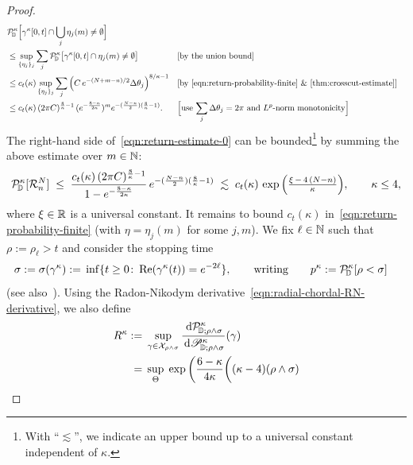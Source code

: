 \documentclass[a4paper, 11pt]{article}
\theoremstyle{definition}
\numberwithin{equation}{section}
\numberwithin{figure}{section}
\renewcommand\Re{\operatorname{Re}}
\newcommand{\Dpaths}[1][]{\cX_{#1}}
\newcommand{\rhittingtime}[1][]{\rho_{#1}}
\newcommand{\rDmeas}[1]{\mathcal{P}^{#1}_{\!\bD}}
\newcommand{\rDmeasure}[2][]{\mathcal{P}^{#2}_{\!\bD;#1}}
\newcommand{\cDmeasure}[2][]{\mathscr{P}^{#2}_{\!\bD;#1}}
\newcommand{\returnevent}[2]{\mathcal{R}_{#1}^{#2}}
\begin{document}
\begin{proof}
\begin{align*}
&\rDmeas{\kappa}\Big[\gamma^\kappa[0,t] \cap \bigcup_j \eta_j(m) \ne \emptyset\Big] \\
&\le \sup_{\{\eta_j\}_j} \sum_j \rDmeas{\kappa}\big[\gamma^\kappa[0,t] \cap \eta_j(m) \ne \emptyset\big] && \textnormal{[by the union bound]} \\
&\le c_t(\kappa) \sup_{\{\eta_j\}_j} \sum_j\Big(C \, e^{-(N+m-n)/2}\Delta\theta_j\Big)^{8/\kappa - 1}  && \textnormal{[by~\eqref{eqn:return-probability-finite}~\&~\Cref{thm:crosscut-estimate}]} \\
&\le c_t(\kappa) \, (2\pi C)^{\frac{8}{\kappa}-1} \, (e^{-\frac{8-\kappa}{2\kappa}})^{m}e^{-(\frac{N-n}{2})(\frac{8}{\kappa}-1)} . && 
\textnormal{\Big[use $\sum_j \Delta\theta_j = 2\pi$ and $L^p$-norm monotonicity\Big]}
\end{align*}
The right-hand side of~\eqref{eqn:return-estimate-0} can be bounded\footnote{With ``$\lesssim$'', we indicate an upper bound up to a universal constant independent of $\kappa$.} 
by summing the above estimate over $m \in \mathbb{N}$:
\begin{align}\label{eqn:return-estimate-1}
\rDmeas{\kappa}[\returnevent{n}{N}] 
\;\le\; \frac{c_t(\kappa) \,  (2\pi C)^{\frac{8}{\kappa}-1}}{1-e^{-\frac{8-\kappa}{2\kappa}}} \, e^{-(\frac{N-n}{2})(\frac{8}{\kappa}-1)} 
\;\lesssim\; c_t(\kappa) \, \exp\Big( \tfrac{\xi \, - \, 4 \, (N-n)}{\kappa}\Big) 
, \qquad \kappa \le 4 ,
\end{align}
where $\xi \in \mathbb{R}$ is a universal constant.  
It remains to bound $c_t(\kappa)$ in~\eqref{eqn:return-probability-finite} (with $\eta = \eta_j(m)$ for some $j, m$). 
We fix $\ell \in \mathbb{N}$ such that $\rho := \rhittingtime[\ell] > t$  and consider the stopping time 
\begin{align*}
\sigma := \sigma(\gamma^{\kappa})
:= \; & \inf\{t \ge 0 \colon \Re (\gamma^{\kappa}(t)) = e^{-2\ell} \} ,
\qquad \textnormal{writing} \qquad 
p^{\kappa} := \rDmeas{\kappa}[\rho < \sigma]
\end{align*}
(see also~). 
Using the Radon-Nikodym derivative~\eqref{eqn:radial-chordal-RN-derivative}, 
we also define
\begin{align}\label{eq:Radon-Nikodym_estimate}
\begin{split}
R^{\kappa}
:=\;& \sup_{\gamma \in \Dpaths[\rho\wedge\sigma]} 
\frac{\ud \rDmeasure[\rho\wedge\sigma]{\kappa}}{\ud \cDmeasure[\rho\wedge\sigma]{\kappa}}(\gamma) 
\\
= \;& \sup_{\Theta} \;
\exp\bigg(\frac{6-\kappa}{4\kappa}\bigg((\kappa-4) (\rho\wedge\sigma) 

\end{split}
\end{align}
\end{proof}
\end{document}
